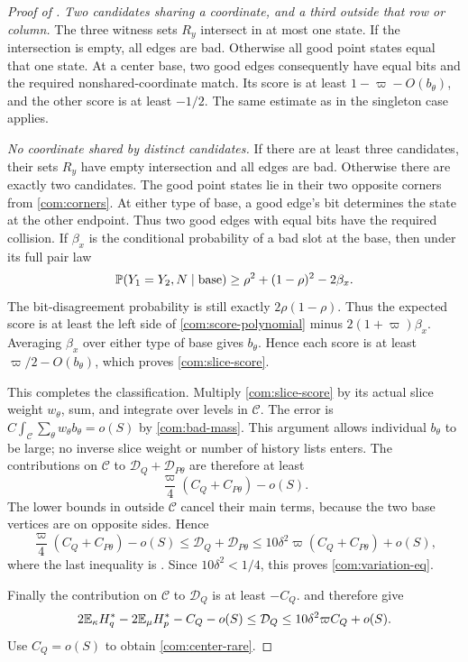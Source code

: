 \begin{proof}[Proof of ]
\emph{Two candidates sharing a coordinate, and a third outside that row
or column.}
The three witness sets \(R_y\) intersect in at most one state. If the
intersection is empty, all edges are bad. Otherwise all good point states
equal that one state. At a center base, two good edges consequently have
equal bits and the required nonshared-coordinate match. Its score is at
least \(1-\varpi-O(b_\theta)\), and the other score is at least \(-1/2\).
The same estimate as in the singleton case applies.

\emph{No coordinate shared by distinct candidates.}
If there are at least three candidates, their sets \(R_y\) have empty intersection and
all edges are bad. Otherwise there are exactly two candidates. The good
point states lie in their two opposite corners from \eqref{com:corners}.
At either type of base, a good edge's bit determines the state at the other
endpoint. Thus two good edges with equal bits have the required collision.
If \(\beta_x\) is the conditional probability of a bad slot at the base,
then under its full pair law
\[
 \mathbb P(Y_1=Y_2,N\mid\text{base})
 \ge \rho^2+(1-\rho)^2-2\beta_x.
\]
The bit-disagreement probability is still exactly \(2\rho(1-\rho)\).
Thus the expected score is at least the left side of
\eqref{com:score-polynomial} minus \(2(1+\varpi)\beta_x\).
Averaging \(\beta_x\) over either type of base gives \(b_\theta\). Hence
each score is at least \(\varpi/2-O(b_\theta)\), which proves
\eqref{com:slice-score}.

This completes the classification. Multiply \eqref{com:slice-score} by its
actual slice weight \(w_\theta\), sum, and integrate over levels in $\mathcal C$.
The error is
\(C\int_{\mathcal C}\sum_\theta w_\theta b_\theta=o(S)\) by
\eqref{com:bad-mass}. This argument allows individual \(b_\theta\) to be
large; no inverse slice weight or number of history lists enters. The contributions on $\mathcal C$ to \(\mathcal D_Q+\mathcal D_{P\theta}\) are therefore at least
\[
 \frac\varpi4(C_Q+C_{P\theta})-o(S).
\]
The lower bounds in  outside $\mathcal C$ cancel their
main terms, because the two base vertices are on opposite sides. Hence
\[
 \frac\varpi4(C_Q+C_{P\theta})-o(S)
 \le \mathcal D_Q+\mathcal D_{P\theta}
 \le 10\delta^2\varpi(C_Q+C_{P\theta})+o(S),
\]
where the last inequality is . Since
\(10\delta^2<1/4\), this proves \eqref{com:variation-eq}.

Finally the contribution on $\mathcal C$ to \(\mathcal D_Q\) is at least \(-C_Q\).
 and  therefore give
\[
 2\mathbb E_\kappa H_q^*-2\mathbb E_\mu H_p^*-C_Q-o(S)
 \le \mathcal D_Q\le10\delta^2\varpi C_Q+o(S).
\]
Use \(C_Q=o(S)\) to obtain \eqref{com:center-rare}.
\end{proof}

